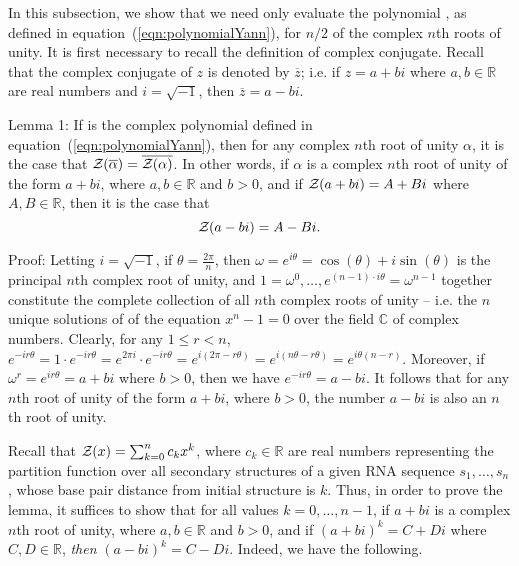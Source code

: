 In this subsection, we show that we need only evaluate the polynomial
\emZ{}, as defined in
equation~(\ref{eqn:polynomialYann}), for $n/2$ of the complex $n$th roots
of unity. It is first necessary to recall the definition of complex
conjugate.
Recall that the complex conjugate of $z$ is denoted by $\overline{z}$;
i.e. if $z=a+bi$ where $a,b \in \mathbb{R}$ are real numbers and
$i = \sqrt{-1}$,  then $\overline{z} = a-bi$.
\smallskip

\noindent
{\sc Lemma 1:} If \emZ{} is the complex polynomial defined in
equation~(\ref{eqn:polynomialYann}), then for any complex $n$th root of
unity $\alpha$, it is the case that ${\mathcal Z}_{}(\overline{\alpha}) =
\overline{{\mathcal Z}_{}(\alpha)}$. In other words, if $\alpha$ is a complex $n$th root
of unity of the form $a+bi$, where $a,b \in \mathbb{R}$ and $b>0$, and
if ${\mathcal Z}_{}(a+bi) = A + Bi$ where $A,B \in \mathbb{R}$, then it is the case that
\[
{\mathcal Z}_{}(a-bi) = A - Bi.
\]
\smallskip

\noindent
{\sc Proof:}
Letting $i = \sqrt{-1}$, if  $\theta = \frac{2 \pi}{n}$, then
$\omega = e^{i \theta} = \cos(\theta) + i \sin(\theta)$
is the principal $n$th complex root of unity, and
$1=\omega^{0},\ldots,e^{(n-1)\cdot i \theta}=\omega^{n-1}$ together
constitute the complete collection of all
$n$th complex roots of unity -- i.e. the $n$ unique solutions of
of the equation $x^n -1 = 0$ over the field $\mathbb{C}$ of complex numbers.
Clearly, for any $1 \leq r < n$,
$e^{-i r \theta} = 1 \cdot e^{-i r \theta} =
e^{2 \pi i} \cdot e^{-i r \theta} = e^{i(2 \pi - r \theta)} =
e^{i(n \theta - r \theta)} = e^{i \theta (n - r)}$.
Moreover, if $\omega^r = e^{i r \theta} = a + b i$ where
$b>0$, then we have $e^{-i r \theta} = a-bi$. It follows that for any
$n$th root of unity of the form $a+bi$, where $b>0$, the number $a-bi$
is also an $n$th root of unity.

Recall that ${\mathcal Z}_{}(x) = \sum_{k=0}^n c_k x^k$, where
$c_k\in \mathbb{R}$ are real numbers representing the partition function
 over
all secondary structures of a given RNA sequence $s_1,\ldots,s_n$,
whose base pair distance from initial structure
\strSt is $k$. Thus, in order to prove the lemma, it suffices to show
that for all values $k=0,\ldots,n-1$, if $a+bi$ is a complex $n$th
root of unity, where $a,b \in \mathbb{R}$
and $b>0$, and if $(a+bi)^k = C+Di$ where $C,D \in \mathbb{R}$, {\em then}
$(a-bi)^k = C-Di$. Indeed, we have the following.

